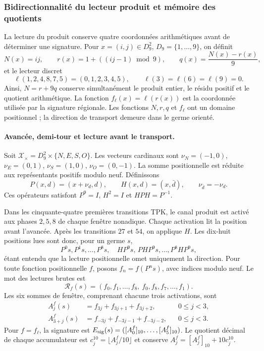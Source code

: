 \subsubsection{Bidirectionnalité du lecteur produit et mémoire des quotients}
\label{bim09:seccion}

La lecture du produit conserve quatre coordonnées arithmétiques avant de déterminer une signature. Pour $x=(i,j)\in D_9^2$, $D_9=\{1,\ldots,9\}$, on définit
\[
 N(x)=ij,\qquad r(x)=1+((ij-1)\bmod9),\qquad
 q(x)=\frac{N(x)-r(x)}9,
\]
et le lecteur discret
\[
 \ell(1,2,4,8,7,5)=(0,1,2,3,4,5),\qquad
 \ell(3)=\ell(6)=\ell(9)=0.
\]
Ainsi, $N=r+9q$ conserve simultanément le produit entier, le résidu positif
et le quotient arithmétique. La fonction $f_\ell(x)=\ell(r(x))$ est la
coordonnée utilisée par la signature régionale. Les fonctions $N,r,q$ et
$f_\ell$ ont un domaine positionnel ; la direction de transport demeure
dans le germe orienté.

\paragraph{Avancée, demi-tour et lecture avant le transport.}

Soit $\mathscr X_\times=D_9^2\times\{N,E,S,O\}$. Les vecteurs cardinaux
sont $\nu_N=(-1,0)$, $\nu_E=(0,1)$, $\nu_S=(1,0)$,
$\nu_O=(0,-1)$. La somme positionnelle est réduite aux représentants positifs
modulo neuf. Définissons
\[
 P(x,d)=(x+\nu_d,d),\qquad H(x,d)=(x,\bar d),
 \qquad \nu_{\bar d}=-\nu_d.
\]
Ces opérateurs satisfont $P^9=I$, $H^2=I$ et $HPH=P^{-1}$.

Dans les cinquante-quatre premières transitions TPK, le canal produit
est activé aux phases $2,5,8$ de chaque fenêtre nonadique. Chaque activation
lit la position avant l'avancée. Après les transitions $27$ et $54$,
on applique $H$. Les dix-huit positions lues sont donc, pour un
germe $s$,
\[
 P^0s,P^1s,\ldots,P^8s,\quad
 HP^9s,\,P H P^9s,\ldots,P^8H P^9s,
\]
étant entendu que la lecture positionnelle omet uniquement la direction.
Pour toute fonction positionnelle $f$, posons $f_n=f(P^ns)$, avec
indices modulo neuf. Le mot des lectures brutes est
\begin{equation}
 \mathcal R_f(s)=
 (f_0,f_1,\ldots,f_8,\ f_0,f_8,f_7,\ldots,f_1).
 \label{bim09:palabra}
\end{equation}
Les six sommes de fenêtre, comprenant chacune trois activations, sont
\begin{align}
 A_j^f(s)&=f_{3j}+f_{3j+1}+f_{3j+2},&&0\leq j<3,\label{bim09:ida}\\
 A_{3+j}^f(s)&=f_{-3j}+f_{-3j-1}+f_{-3j-2},&&0\leq j<3.
 \label{bim09:vuelta}
\end{align}
Pour $f=f_\ell$, la signature est
$E_{\rm sig}(s)=([A_0^f]_{10},\ldots,[A_5^f]_{10})$.
Le quotient décimal de chaque accumulateur est
$c_j^{10}=\lfloor A_j^f/10\rfloor$ et conserve
$A_j^f=[A_j^f]_{10}+10c_j^{10}$.

